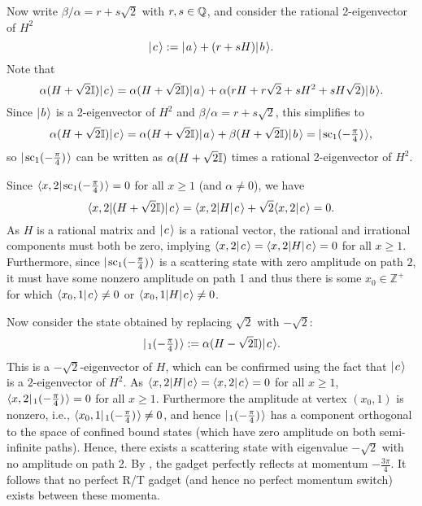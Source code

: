 \documentclass[../thesis-main/thesis-main]{subfiles}
\begin{document}
Now write $\beta/\alpha=r+s\sqrt{2}$ with $r,s\in\mathbb{Q}$, and consider the rational 2-eigenvector of $H^2$
\begin{equation}
  |\mspace{2mu} c \mspace{2mu} \rangle := |\mspace{2mu} a \mspace{2mu} \rangle + (r+sH) |\mspace{2mu} b \mspace{2mu} \rangle.
\end{equation}
Note that
\begin{equation}
  \alpha (H + \sqrt{2} \mathbb{I}) |\mspace{2mu} c \mspace{2mu} \rangle 
= \alpha(H+ \sqrt{2} \mathbb{I}) |\mspace{2mu} a \mspace{2mu} \rangle + \alpha (rH+r\sqrt{2}+ sH^2+sH\sqrt{2}) |\mspace{2mu} b \mspace{2mu} \rangle.
\end{equation}
Since $|\mspace{2mu} b \mspace{2mu} \rangle$ is a 2-eigenvector of $H^2$ and $\beta/\alpha=r+s\sqrt{2}$, this simplifies to
\begin{equation}
  \alpha (H + \sqrt{2}\mathbb{I}) |\mspace{2mu} c \mspace{2mu} \rangle 
  = \alpha (H + \sqrt{2}\mathbb{I}) |\mspace{2mu} a \mspace{2mu} \rangle + \beta(H + \sqrt{2}\mathbb{I}) |\mspace{2mu} b \mspace{2mu} \rangle 
  = |\mspace{2mu} \text{sc}_1(-\tfrac{\pi}{4}) \mspace{2mu} \rangle, \label{eq:sc1_c}
\end{equation}
so $|\mspace{2mu} \text{sc}_1(-\tfrac{\pi}{4}) \mspace{2mu} \rangle$ can be written as $\alpha(H+\sqrt{2}\mathbb{I})$ times a rational 2-eigenvector of $H^2$.

Since $\langle{x,2}|\mspace{2mu} \text{sc}_1(-\tfrac{\pi}{4}) \mspace{2mu} \rangle = 0$ for all $x\geq 1$ (and $\alpha\neq 0$), we have
\begin{equation}
  \langle{x,2}| (H+\sqrt{2}\mathbb{I}) |\mspace{2mu} c \mspace{2mu} \rangle 
  = \langle{x,2}| H |\mspace{2mu} c \mspace{2mu} \rangle + \sqrt{2} \langle{x,2}|\mspace{2mu} c \mspace{2mu} \rangle 
  = 0.
\end{equation}
As $H$ is a rational matrix and $|\mspace{2mu} c \mspace{2mu} \rangle$ is a rational vector, the rational and irrational components must both be zero, implying $\langle{x,2}|\mspace{2mu} c \mspace{2mu} \rangle  =\langle{x,2}|H|\mspace{2mu} c \mspace{2mu} \rangle = 0$ for all $x\geq 1$. Furthermore, since $ |\mspace{2mu} \text{sc}_1(-\tfrac{\pi}{4}) \mspace{2mu} \rangle$ is a scattering state with zero amplitude on path $2$, it must have some nonzero amplitude on path 1 and thus there is some $x_0\in \mathbb{Z}^+$ for which $\langle{x_0,1}|\mspace{2mu} c \mspace{2mu} \rangle\neq 0$ or $\langle{x_0,1}|H|\mspace{2mu} c \mspace{2mu} \rangle \neq 0$.

Now consider the state obtained by replacing $\sqrt{2}$ with $-\sqrt{2}$:
\begin{equation}
  |\mspace{2mu} \overline{\sc}_1(-\tfrac{\pi}{4}) \mspace{2mu} \rangle := \alpha (H-\sqrt{2}\mathbb{I}) |\mspace{2mu} c \mspace{2mu} \rangle.
\end{equation}
This is a $-\sqrt{2}$-eigenvector of $H$, which can be confirmed using the fact that $|\mspace{2mu} c \mspace{2mu} \rangle$ is a $2$-eigenvector of $H^2$. As $\langle{x,2} | H |\mspace{2mu} c \mspace{2mu} \rangle = \langle x,2 |\mspace{2mu} c \mspace{2mu} \rangle = 0$ for all $x\geq 1$, $\langle x,2 |\mspace{2mu} \overline{\sc}_1(-\tfrac{\pi}{4}) \mspace{2mu} \rangle = 0$ for all $x\geq 1$. Furthermore the amplitude at vertex $(x_0,1)$ is nonzero, i.e.,  $\langle x_0,1 |\mspace{2mu} \overline{\sc}_1(-\tfrac{\pi}{4}) \mspace{2mu} \rangle \neq 0$, and hence $|\mspace{2mu} \overline{\sc}_1(-\tfrac{\pi}{4}) \mspace{2mu} \rangle$ has a component orthogonal to the space of confined bound states (which have zero amplitude on both semi-infinite paths).  Hence, there exists a scattering state with eigenvalue $-\sqrt{2}$ with no amplitude on path 2. By , the gadget perfectly reflects at momentum $-\frac{3\pi}{4}$.  It follows that no perfect R/T gadget (and hence no perfect momentum switch) exists between these momenta.
\end{document}
